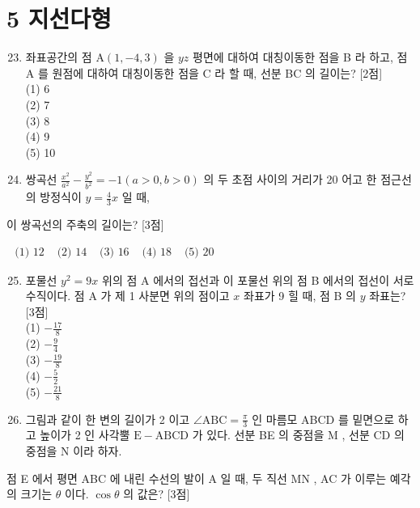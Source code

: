 \documentclass[10pt]{article}
\begin{document}
\section*{5 지선다형}
\begin{enumerate}
  \setcounter{enumi}{22}
  \item 좌표공간의 점 $\mathrm{A}(1,-4,3)$ 을 $y z$ 평면에 대하여 대칭이동한 점을 B 라 하고, 점 A 를 원점에 대하여 대칭이동한 점을 C 라 할 때, 선분 BC 의 길이는? [2점]\\
(1) 6\\
(2) 7\\
(3) 8\\
(4) 9\\
(5) 10

  \item 쌍곡선 $\frac{x^{2}}{a^{2}}-\frac{y^{2}}{b^{2}}=-1(a>0, b>0)$ 의 두 초점 사이의 거리가 20 어고 한 점근선의 방정식이 $y=\frac{4}{3} x$ 일 때,

\end{enumerate}

이 쌍곡선의 주축의 길이는? [3점]

$\begin{array}{lllll}\text { (1) } 12 & \text { (2) } 14 & \text { (3) } 16 & \text { (4) } 18 & \text { (5) } 20\end{array}$

\begin{enumerate}
  \setcounter{enumi}{24}
  \item 포물선 $y^{2}=9 x$ 위의 점 A 에서의 접선과 이 포물선 위의 점 B 에서의 접선이 서로 수직이다. 점 A 가 제 1 사분면 위의 점이고 $x$ 좌표가 9 힐 때, 점 B 의 $y$ 좌표는? [3점]\\
(1) $-\frac{17}{8}$\\
(2) $-\frac{9}{4}$\\
(3) $-\frac{19}{8}$\\
(4) $-\frac{5}{2}$\\
(5) $-\frac{21}{8}$

  \item 그림과 같이 한 변의 길이가 2 이고 $\angle \mathrm{ABC}=\frac{\pi}{3}$ 인 마름모 ABCD 를 밑면으로 하고 높이가 2 인 사각뿔 $\mathrm{E}-\mathrm{ABCD}$ 가 있다. 선분 BE 의 중점을 M , 선분 CD 의 중점을 N 이라 하자.

\end{enumerate}

점 E 에서 평면 ABC 에 내린 수선의 발이 A 일 때, 두 직선 MN , AC 가 이루는 예각의 크기는 $\theta$ 이다. $\cos \theta$ 의 값은? [3점]
\end{document}
